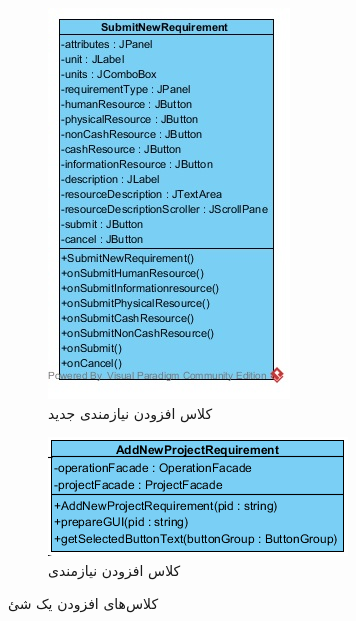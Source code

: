 \begin{figure}[H]
\begin{subfigure}[b]{0.3\textwidth}
		\includegraphics[width=\textwidth]{img/class-design/ui/SubmitNewRequirement.jpg}
		\caption{کلاس افزودن نیازمندی جدید}
	\end{subfigure}
	\begin{subfigure}[b]{0.3\textwidth}
		\includegraphics[width=\textwidth]{img/class-design/ui/AddNewProjectRequirement}
		\caption{کلاس افزودن نیازمندی}
	\end{subfigure}
	\caption{کلاس‌های افزودن یک شئ}
\end{figure}



